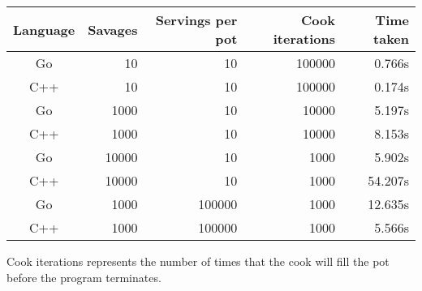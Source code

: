 \documentclass[11pt]{article}
\begin{document}
\begin{tabular}{c r r r r}
Language    & Savages & Servings per pot & Cook iterations & Time taken \\
\toprule
Go 			& 10 & 10 & 100000 & 0.766s \\
C++         & 10 & 10 & 100000 & 0.174s \\
\cmidrule{1-5}
Go 			& 1000 & 10 & 10000 & 5.197s \\
C++         & 1000 & 10 & 10000 & 8.153s \\
\cmidrule{1-5}
Go 			& 10000 & 10 & 1000 & 5.902s \\
C++         & 10000 & 10 & 1000 & 54.207s \\
\cmidrule{1-5}
Go 			& 1000 & 100000 & 1000 & 12.635s \\
C++         & 1000 & 100000 & 1000 & 5.566s \\
\end{tabular}
\newline
Cook iterations represents the number of times that the cook will fill the pot before the program terminates.
\pagebreak
\end{document}
